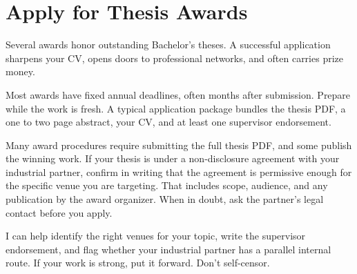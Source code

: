 \documentclass{../sharedAssets/tufte}
\begin{document}
\clearpage
\section{Apply for Thesis Awards}
Several awards honor outstanding Bachelor's theses.
A successful application sharpens your CV, opens doors to professional networks, and often
carries prize money.

Most awards have fixed annual deadlines, often months after submission.
Prepare while the work is fresh.
A typical application package bundles the thesis PDF, a one to two page abstract, your CV,
and at least one supervisor endorsement.

Many award procedures require submitting the full thesis PDF, and some publish the winning
work.
If your thesis is under a non-disclosure agreement with your industrial partner, confirm
in writing that the agreement is permissive enough for the specific venue you are
targeting.
That includes scope, audience, and any publication by the award organizer.
When in doubt, ask the partner's legal contact before you apply.

I can help identify the right venues for your topic, write the supervisor endorsement, and
flag whether your industrial partner has a parallel internal route.
If your work is strong, put it forward.
Don't self-censor.
\end{document}
